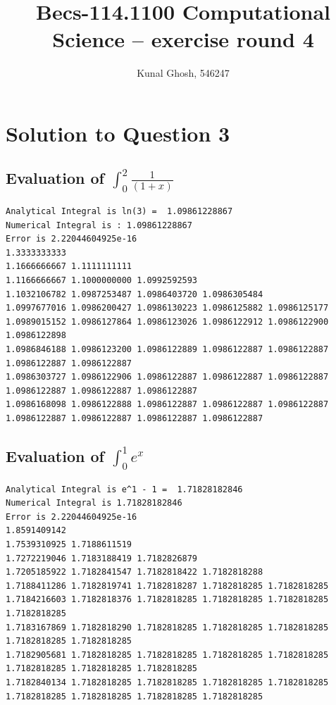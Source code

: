 \documentclass[a4paper,11pt]{article}
\begin{document}
\title{Becs-114.1100 Computational Science -- exercise round 4} %
\author{Kunal Ghosh, 546247} %
\maketitle
\section{Solution to Question 3}\label{prob3a}
\subsection{Evaluation of $\int_{0}^{2} \frac{1}{(1+x)}$}
\begin{lstlisting}
Analytical Integral is ln(3) =  1.09861228867
Numerical Integral is : 1.09861228867
Error is 2.22044604925e-16
1.3333333333
1.1666666667 1.1111111111
1.1166666667 1.1000000000 1.0992592593
1.1032106782 1.0987253487 1.0986403720 1.0986305484
1.0997677016 1.0986200427 1.0986130223 1.0986125882 1.0986125177
1.0989015152 1.0986127864 1.0986123026 1.0986122912 1.0986122900 1.0986122898
1.0986846188 1.0986123200 1.0986122889 1.0986122887 1.0986122887 1.0986122887 1.0986122887
1.0986303727 1.0986122906 1.0986122887 1.0986122887 1.0986122887 1.0986122887 1.0986122887 1.0986122887
1.0986168098 1.0986122888 1.0986122887 1.0986122887 1.0986122887 1.0986122887 1.0986122887 1.0986122887 1.0986122887
\end{lstlisting}

\subsection{Evaluation of $\int_{0}^{1} e^x$}
\begin{lstlisting}
Analytical Integral is e^1 - 1 =  1.71828182846
Numerical Integral is 1.71828182846
Error is 2.22044604925e-16
1.8591409142
1.7539310925 1.7188611519
1.7272219046 1.7183188419 1.7182826879
1.7205185922 1.7182841547 1.7182818422 1.7182818288
1.7188411286 1.7182819741 1.7182818287 1.7182818285 1.7182818285
1.7184216603 1.7182818376 1.7182818285 1.7182818285 1.7182818285 1.7182818285
1.7183167869 1.7182818290 1.7182818285 1.7182818285 1.7182818285 1.7182818285 1.7182818285
1.7182905681 1.7182818285 1.7182818285 1.7182818285 1.7182818285 1.7182818285 1.7182818285 1.7182818285
1.7182840134 1.7182818285 1.7182818285 1.7182818285 1.7182818285 1.7182818285 1.7182818285 1.7182818285 1.7182818285

\end{lstlisting}
\end{document}

